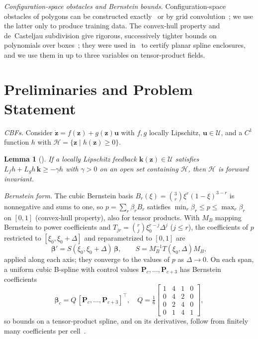 \documentclass[journal]{IEEEtran}
\newtheorem{lemma}{Lemma}
\theoremstyle{definition}
\begin{document}
\emph{Configuration-space obstacles and Bernstein bounds.} Configuration-space obstacles of polygons
can be constructed exactly~\cite{lozanoperez1983spatial,latombe1991robot} or by grid
convolution~\cite{kavraki1995fft}; we use the latter only to produce training data. The
convex-hull property and de~Casteljau subdivision give rigorous, successively tighter bounds on
polynomials over boxes~\cite{farin2002curves,sherbrooke1993computation}; they were used
in~\cite{jo2027semantic} to certify planar spline enclosures, and we use them in up to three
variables on tensor-product fields.

\section{Preliminaries and Problem Statement}\label{sec:prelim}

\emph{CBFs.} Consider $\dot{\mathbf z}=f(\mathbf z)+g(\mathbf z)\mathbf u$ with $f,g$ locally
Lipschitz, $\mathbf u\in\mathcal U$, and a $C^1$ function $h$ with
$\mathcal H=\{\mathbf z\mid h(\mathbf z)\ge0\}$.
\begin{lemma}[\cite{ames2019cbf}]\label{lem:cbf}
If a locally Lipschitz feedback $\mathbf k(\mathbf z)\in\mathcal U$ satisfies
$L_fh+L_gh\,\mathbf k\ge-\gamma h$ with $\gamma>0$ on an open set containing $\mathcal H$, then
$\mathcal H$ is forward invariant.
\end{lemma}

\emph{Bernstein form.} The cubic Bernstein basis $B_r(\xi)=\binom3r\xi^r(1-\xi)^{3-r}$ is
nonnegative and sums to one, so $p=\sum_r\beta_rB_r$ satisfies $\min_r\beta_r\le p\le\max_r\beta_r$
on $[0,1]$ (convex-hull property), also for tensor products. With $M_B$ mapping Bernstein to power
coefficients and $T_{jr}=\binom rj\xi_0^{r-j}\Delta^j$ ($j\le r$), the coefficients of $p$ restricted
to $[\xi_0,\xi_0+\Delta]$ and reparametrized to $[0,1]$ are
\begin{equation}\label{eq:subdiv}
\boldsymbol\beta'=S(\xi_0,\xi_0+\Delta)\,\boldsymbol\beta,\qquad S=M_B^{-1}T(\xi_0,\Delta)M_B,
\end{equation}
applied along each axis; they converge to the values of $p$ as $\Delta\to0$. On each span, a uniform
cubic B-spline with control values $\mathbf P_c,\dots,\mathbf P_{c+3}$ has Bernstein coefficients
\begin{equation}\label{eq:b2b}
\boldsymbol\beta_c=Q\,[\mathbf P_{c},\dots,\mathbf P_{c+3}]^{\top},\quad
Q=\tfrac16\left[\begin{smallmatrix}1&4&1&0\\0&4&2&0\\0&2&4&0\\0&1&4&1\end{smallmatrix}\right],
\end{equation}
so bounds on a tensor-product spline, and on its derivatives, follow from finitely many
coefficients per cell~\cite{farin2002curves,jo2027semantic}.
\end{document}
